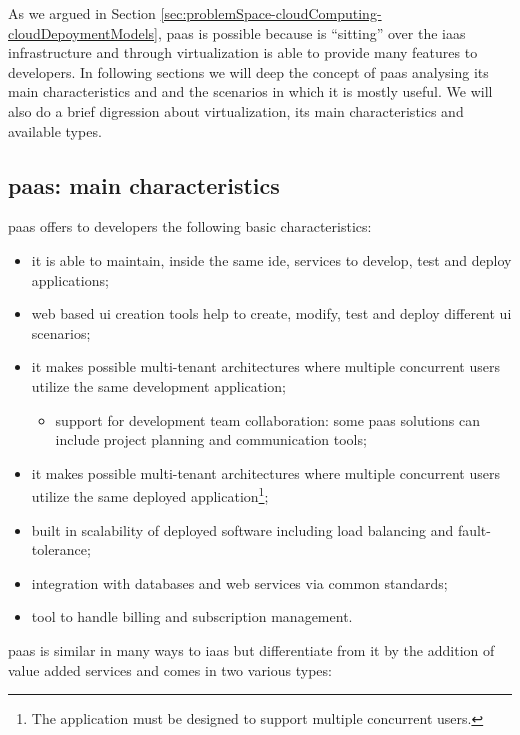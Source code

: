 As we argued in Section \ref{sec:problemSpace-cloudComputing-cloudDepoymentModels}, \ac{paas} is possible
because is ``sitting'' over the \ac{iaas} infrastructure and through virtualization is able to provide many
features to developers. In following sections we will deep the concept of \ac{paas}
analysing its main characteristics and and the scenarios in which it is mostly useful. We will also
do a brief digression about virtualization, its main characteristics and available types.

\subsection{\acs{paas}: main characteristics}
\label{sec:problemSpace-paas-paasCharacteristics}
\ac{paas} offers to developers the following basic characteristics:

\begin{itemize}
	\item{it is able to maintain, inside the same \ac{ide}, services to develop, test and deploy
		applications;}
	\item{web based \ac{ui} creation tools help to create, modify, test and deploy different \ac{ui}
		scenarios;}
	\item{it makes possible multi-tenant architectures where multiple concurrent users utilize the same
		development application;}
	\begin{itemize}
		\item{support for development team collaboration: some \ac{paas} solutions can include project
			planning and communication tools;}
	\end{itemize}
	\item{it makes possible multi-tenant architectures where multiple concurrent users utilize the same
		deployed application\footnote{The application must be designed to support multiple concurrent
			users.};}
	\item{built in scalability of deployed software including load balancing and fault-tolerance;}
	\item{integration with databases and web services via common standards;}
	\item{tool to handle billing and subscription management.}
\end{itemize}

\ac{paas} is similar in many ways to \ac{iaas} but differentiate from it by the addition of value added
services and comes in two various types:

